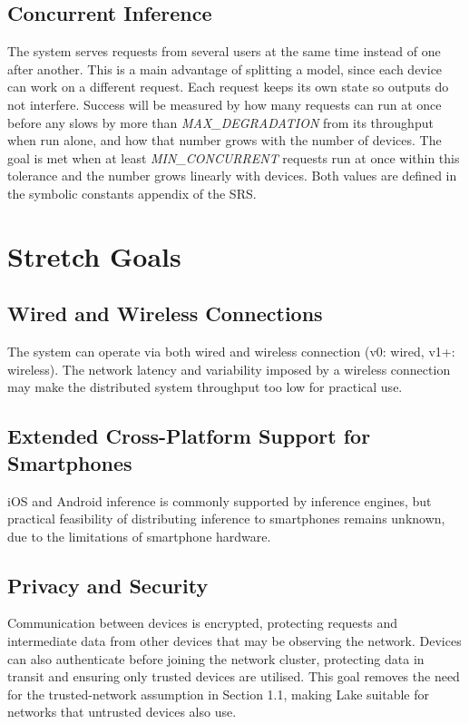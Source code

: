 \documentclass{article}
\begin{document}
\subsection{Concurrent Inference}\label{sec:concurrent-inference}
The system serves requests from several users at the same time instead of one
after another. This is a main advantage of splitting a model, since each
device can work on a different request. Each request keeps its own state so
outputs do not interfere. Success will be measured by how many requests can
run at once before any slows by more than \textit{MAX\_DEGRADATION} from its
throughput when run alone, and how that number grows with the number of
devices. The goal is met when at least \textit{MIN\_CONCURRENT} requests run
at once within this tolerance and the number grows linearly with devices.
Both values are defined in the symbolic constants appendix of the SRS.

\section{Stretch Goals}

\subsection{Wired and Wireless Connections}
The system can operate via both wired and wireless connection (v0: wired, v1+: wireless). The network latency and variability imposed by a wireless connection may make the distributed system throughput too low for practical use.

\subsection{Extended Cross-Platform Support for Smartphones}
iOS and Android inference is commonly supported by inference engines, but practical feasibility of distributing inference to smartphones remains unknown, due to the limitations of smartphone hardware.

\subsection{Privacy and Security}\label{sec:privacy-security}
Communication between devices is encrypted, protecting requests and intermediate data from other devices that may be observing the network. Devices can also authenticate before joining the network cluster, protecting data in transit and ensuring only trusted devices are utilised. This goal removes the need for the trusted-network assumption in Section 1.1, making Lake suitable for networks that untrusted devices also use.
\end{document}

